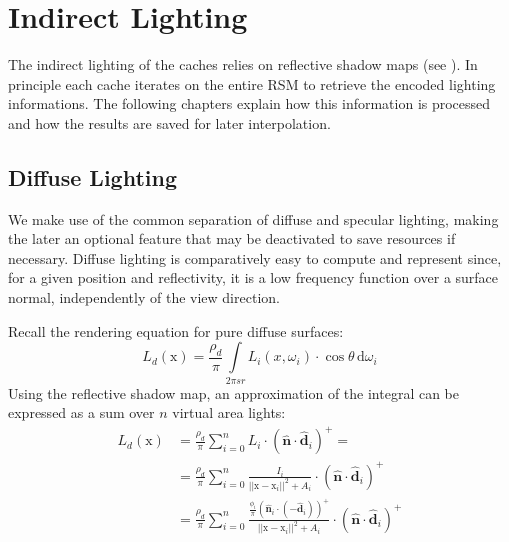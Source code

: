 \documentclass[thesis.tex]{subfiles}
\begin{document}
\section{Indirect Lighting}
The indirect lighting of the caches relies on reflective shadow maps (see ).
In principle each cache iterates on the entire RSM to retrieve the encoded lighting informations.
The following chapters explain how this information is processed and how the results are saved for later interpolation.

\subsection{Diffuse Lighting}
We make use of the common separation of diffuse and specular lighting, making the later an optional feature that may be deactivated to save resources if necessary. 
Diffuse lighting is comparatively easy to compute and represent since, for a given position and reflectivity, it is a low frequency function over a surface normal, independently of the view direction.

Recall the rendering equation for pure diffuse surfaces:
\begin{equation}
L_d (\mathrm{x}) = \frac{\rho_d}{\pi}\int\limits_{2\pi sr} L_i(x,\omega_i) \cdot \cos\theta \,\mathrm{d}\omega_i
\end{equation}
Using the reflective shadow map, an approximation of the integral can be expressed as a sum over $n$ virtual area lights:
\begin{align}
L_d (\mathrm{x})
&=\frac{\rho_d}{\pi}\sum\limits_{i=0}^{n} L_i \cdot (\hat{\mathbf{n}} \cdot \hat{\mathbf{d}}_i)^+ = \\
&=\frac{\rho_d}{\pi}\sum\limits_{i=0}^{n} \frac{I_i }{||\mathrm{x} - \mathrm{x}_i||^2 +  A_i} \cdot (\hat{\mathbf{n}} \cdot \hat{\mathbf{d}}_i)^+ \\
&=\frac{\rho_d}{\pi}\sum\limits_{i=0}^{n} \frac{\frac{\phi_i}{\pi} (\hat{\mathbf{n}}_i \cdot (-\hat{\mathbf{d}}_i) )^+}{||\mathrm{x} - \mathrm{x}_i||^2 +  A_i} \cdot (\hat{\mathbf{n}} \cdot \hat{\mathbf{d}}_i)^+
\end{align}
\end{document}
